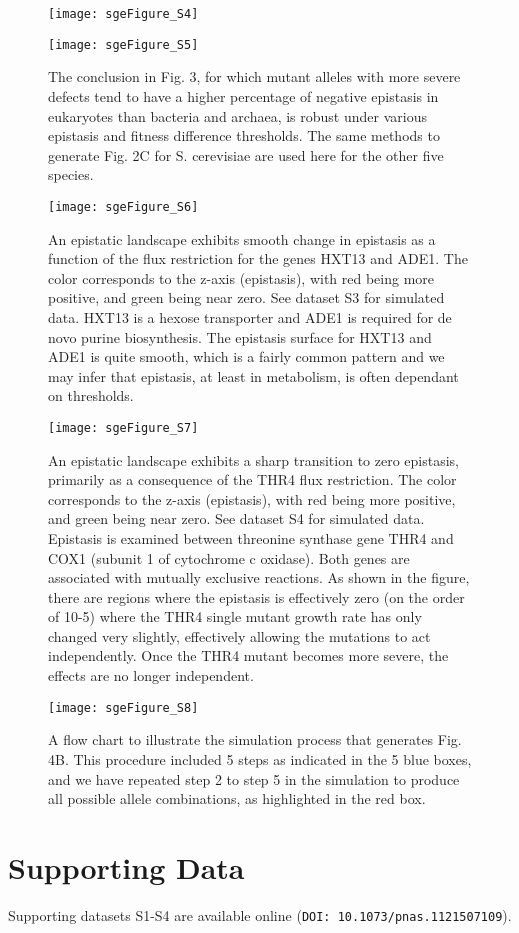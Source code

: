 \begin{figure}[H]
\centering
  \texttt{[image: sgeFigure\_S4]}
\end{figure}

\begin{figure}[H]
\centering
  \texttt{[image: sgeFigure\_S5]}
\caption{The conclusion in Fig. 3, for which mutant alleles with more
severe defects tend to have a higher percentage of negative epistasis
in eukaryotes than bacteria and archaea, is robust under various
epistasis and fitness difference thresholds. The same methods to
generate Fig. 2C for S. cerevisiae are used here for the other five
species.}
\label{fig:sgeS5}
\end{figure}

\begin{figure}[H]
\centering
  \texttt{[image: sgeFigure\_S6]}
\caption{An epistatic landscape exhibits smooth change in epistasis as
a function of the flux restriction for the genes HXT13 and ADE1. The
color corresponds to the z-axis (epistasis), with red being more
positive, and green being near zero. See dataset S3 for simulated
data. HXT13 is a hexose transporter and ADE1 is required for de novo
purine biosynthesis. The epistasis surface for HXT13 and ADE1 is quite
smooth, which is a fairly common pattern and we may infer that
epistasis, at least in metabolism, is often dependant on thresholds.}
\label{fig:sgeS6}
\end{figure}

\begin{figure}[H]
\centering
  \texttt{[image: sgeFigure\_S7]}
\caption{An epistatic landscape exhibits a sharp transition to zero
epistasis, primarily as a consequence of the THR4 flux
restriction. The color corresponds to the z-axis (epistasis), with red
being more positive, and green being near zero. See dataset S4 for
simulated data. Epistasis is examined between threonine synthase gene
THR4 and COX1 (subunit 1 of cytochrome c oxidase). Both genes are
associated with mutually exclusive reactions. As shown in the figure,
there are regions where the epistasis is effectively zero (on the
order of 10-5) where the THR4 single mutant growth rate has only
changed very slightly, effectively allowing the mutations to act
independently. Once the THR4 mutant becomes more severe, the effects
are no longer independent.}
\label{fig:sgeS7}
\end{figure}

\begin{figure}[H]
\centering
  \texttt{[image: sgeFigure\_S8]}
\caption{A flow chart to illustrate the simulation process that
generates Fig. 4B. This procedure included 5 steps as indicated in the
5 blue boxes, and we have repeated step 2 to step 5 in the simulation
to produce all possible allele combinations, as highlighted in the red
box.}
\label{fig:sgeS8}
\end{figure}

\section{Supporting Data}

Supporting datasets S1-S4 are available online (\texttt{DOI:
10.1073/pnas.1121507109}).